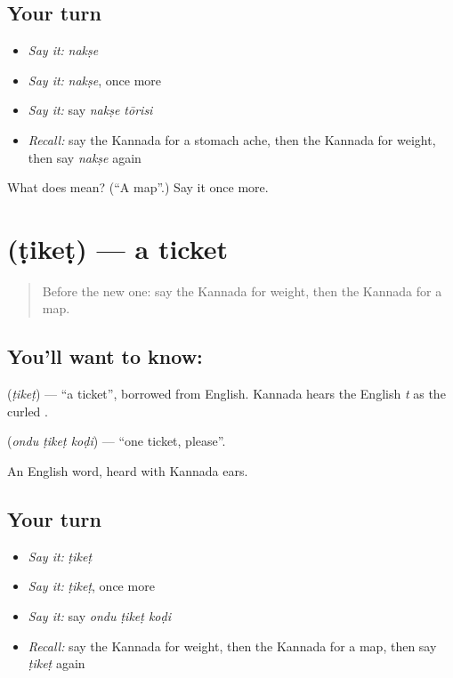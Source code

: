 \subsection*{Your turn}
\begin{itemize}
\raggedright
  \item \emph{Say it:} \emph{nakṣe}
  \item \emph{Say it:} \emph{nakṣe}, once more
  \item \emph{Say it:} say \emph{nakṣe tōrisi}
  \item \emph{Recall:} say the Kannada for a stomach ache, then the Kannada for weight, then say \emph{nakṣe} again
\end{itemize}

\begin{tcolorbox}[breakable,colback=teal!4,colframe=teal!35!black,title={Before you move on}]
What does  mean? (\textquotedblleft{}A map\textquotedblright{}.) Say it once more.
\end{tcolorbox}
\section[\texorpdfstring{\kn{ಟಿಕೆಟ್} (ṭikeṭ)}{ಟಿಕೆಟ್ (ṭikeṭ)}]{ (ṭikeṭ) — a ticket}

\label{lesson:KA-C100-ticket}



\begin{quote}
Before the new one: say the Kannada for weight, then the Kannada for a map.
\end{quote}

\subsection*{You'll want to know: }
\textbf{} (\emph{ṭikeṭ}) — \textquotedblleft{}a ticket\textquotedblright{}, borrowed from English. Kannada hears the English \emph{t} as the curled \textbf{}.

\textbf{  } (\emph{ondu ṭikeṭ koḍi}) — \textquotedblleft{}one ticket, please\textquotedblright{}.

\begin{grammarlens}[title={What you've built}]
An English word, heard with Kannada ears.
\end{grammarlens}

\subsection*{Your turn}
\begin{itemize}
\raggedright
  \item \emph{Say it:} \emph{ṭikeṭ}
  \item \emph{Say it:} \emph{ṭikeṭ}, once more
  \item \emph{Say it:} say \emph{ondu ṭikeṭ koḍi}
  \item \emph{Recall:} say the Kannada for weight, then the Kannada for a map, then say \emph{ṭikeṭ} again
\end{itemize}


